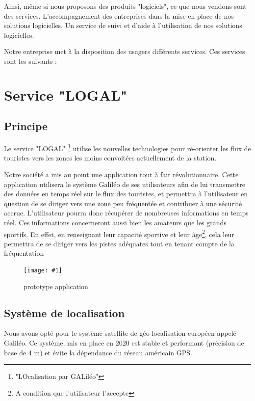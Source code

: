 \documentclass{report}
\newcommand{\iImage}[3]{\begin{figure}[H]\centering\texttt{[image: \#1]}\caption{#2}\end{figure}}
\newcommand{\n}{\newline}
\begin{document}
Ainsi, même si nous proposons des produits "logiciels", ce que nous vendons sont des services. L'accompagnement des entreprises dans la mise en place de nos solutions logicielles.
Un service de suivi et d'aide à l'utilisation de nos solutions logicielles.



Notre entreprise met à la disposition des usagers différents services. Ces services sont les suivants :

\section{Service "LOGAL"}

\subsection{Principe}

Le service "LOGAL" \footnote{"LOcalisation par GALiléo"} utilise les nouvelles technologies pour ré-orienter les flux de touristes vers les zones les moins convoitées actuellement de la station. \newline


Notre société a mis au point une application tout à fait révolutionnaire. Cette application utilisera le système Galiléo de ses utilisateurs afin de lui transmettre des données en temps réel sur le flux des touristes, et permettra à l’utilisateur en question de se diriger vers une zone peu fréquentée et contribuer à une sécurité accrue.\n
L'utilisateur pourra donc récupérer de nombreuses informations en temps réel. Ces informations concerneront aussi bien les amateurs que les grands sportifs.
En effet, en renseignant leur capacité sportive et leur âge\footnote{A condition que l'utilisateur l'accepte}, cela leur permettra de se diriger vers les pistes adéquates tout en tenant compte de la fréquentation

\iImage{Images/application.png}{prototype application}{0.18}



\newpage



\subsection{Système de localisation}

Nous avons opté pour le système satellite de géo-localisation européen appelé Galiléo. \newline 
Ce système, mis en place en 2020 est stable et performant (précision de base de 4 m) et évite la dépendance du réseau américain GPS.
\end{document}
